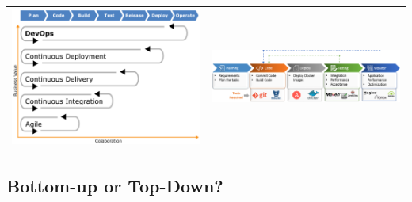 \documentclass[10pt,a4paper,openright,twoside]{../llncs}
\begin{document}
\medskip  
\noindent
\begin{tabular}{ | c | c | }
     \includegraphics[scale = 0.2]{img/devops0.png} & \includegraphics[scale = 0.35]{img/devops1.png}
\end{tabular}



\subsection{Bottom-up or Top-Down?}
\end{document}
